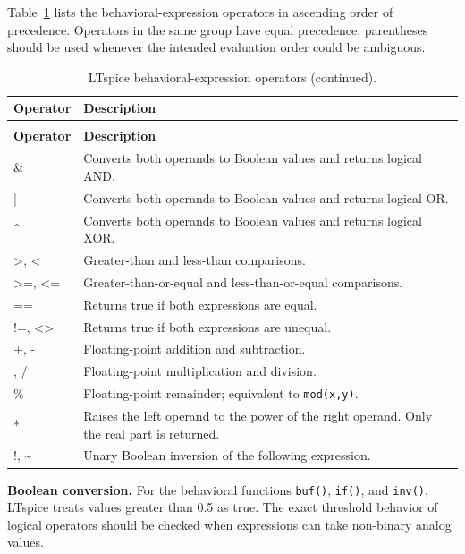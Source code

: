 Table~\ref{tab:ltspice-operators} lists the behavioral-expression operators in
ascending order of precedence. Operators in the same group have equal
precedence; parentheses should be used whenever the intended evaluation order
could be ambiguous.

\begingroup
\small
\renewcommand{\arraystretch}{1.14}
\begin{longtable}{>{\ttfamily\raggedright\arraybackslash}p{}
                  >{\raggedright\arraybackslash}p{}}
\caption{LTspice behavioral-expression operators in ascending order of precedence.}
\label{tab:ltspice-operators}\\
\toprule
\normalfont\bfseries Operator & \bfseries Description \\
\midrule
\endfirsthead
\caption[]{LTspice behavioral-expression operators (continued).}\\
\toprule
\normalfont\bfseries Operator & \bfseries Description \\
\midrule
\endhead
\bottomrule
\endfoot
\& & Converts both operands to Boolean values and returns logical AND. \\
| & Converts both operands to Boolean values and returns logical OR. \\
\textasciicircum & Converts both operands to Boolean values and returns logical XOR. \\
>, < & Greater-than and less-than comparisons. \\
>=, <= & Greater-than-or-equal and less-than-or-equal comparisons. \\
== & Returns true if both expressions are equal. \\
!=, <> & Returns true if both expressions are unequal. \\
+, - & Floating-point addition and subtraction. \\
*, / & Floating-point multiplication and division. \\
\% & Floating-point remainder; equivalent to \texttt{mod(x,y)}. \\
** & Raises the left operand to the power of the right operand. Only the real part is returned. \\
!, \textasciitilde & Unary Boolean inversion of the following expression. \\
\end{longtable}
\endgroup

\begin{noteBox}
\textbf{Boolean conversion.}
For the behavioral functions \texttt{buf()}, \texttt{if()}, and
\texttt{inv()}, LTspice treats values greater than 0.5 as true. The exact
threshold behavior of logical operators should be checked when expressions can
take non-binary analog values.
\end{noteBox}


